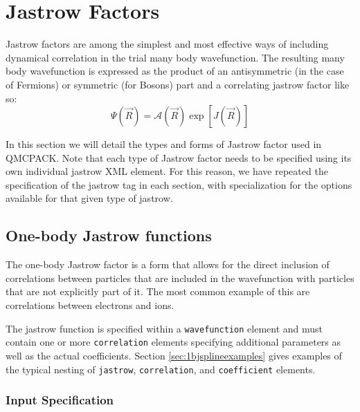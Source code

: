\section{Jastrow Factors}
\label{sec:jastrow}

Jastrow factors are among the simplest and most effective ways of including
dynamical correlation in the trial many body wavefunction.  The resulting many body
wavefunction is expressed as the product of an antisymmetric (in the case
of Fermions) or symmetric (for Bosons) part and a correlating jastrow factor
like so:
\begin{equation}
\Psi(\vec{R}) = \mathcal{A}(\vec{R}) \exp\left[J(\vec{R})\right]
\end{equation}

In this section we will detail the types and forms of Jastrow factor used 
in QMCPACK.  Note that each type of Jastrow factor needs to be specified using
its own individual jastrow XML element.  For this reason, we have repeated the
specification of the jastrow tag in each section, with specialization for the
options available for that given type of jastrow.

\subsection{One-body Jastrow functions}
\label{sec:onebodyjastrow}
The one-body Jastrow factor is a form that allows for the direct inclusion
of correlations between particles that are included in the wavefunction with
particles that are not explicitly part of it.  The most common example of
this are correlations between electrons and ions.  

The jastrow function is specified within a \texttt{wavefunction} element
and must contain one or more \texttt{correlation} elements specifying
additional parameters as well as the actual coefficients. Section
\ref{sec:1bjsplineexamples} gives examples of the typical nesting of
\texttt{jastrow}, \texttt{correlation}, and \texttt{coefficient} elements.

\subsubsection{Input Specification}

